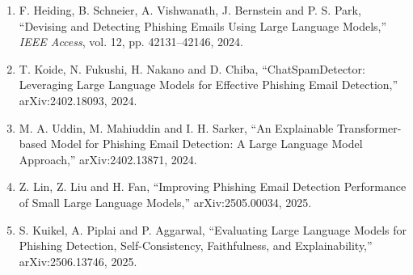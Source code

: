 \documentclass[11pt,a4paper]{article}
\begin{document}
\begin{enumerate}
\item F. Heiding, B. Schneier, A. Vishwanath, J. Bernstein and P. S. Park, ``Devising and Detecting Phishing Emails Using Large Language Models,'' \textit{IEEE Access}, vol. 12, pp. 42131--42146, 2024.
\item T. Koide, N. Fukushi, H. Nakano and D. Chiba, ``ChatSpamDetector: Leveraging Large Language Models for Effective Phishing Email Detection,'' arXiv:2402.18093, 2024.
\item M. A. Uddin, M. Mahiuddin and I. H. Sarker, ``An Explainable Transformer-based Model for Phishing Email Detection: A Large Language Model Approach,'' arXiv:2402.13871, 2024.
\item Z. Lin, Z. Liu and H. Fan, ``Improving Phishing Email Detection Performance of Small Large Language Models,'' arXiv:2505.00034, 2025.
\item S. Kuikel, A. Piplai and P. Aggarwal, ``Evaluating Large Language Models for Phishing Detection, Self-Consistency, Faithfulness, and Explainability,'' arXiv:2506.13746, 2025.
\end{enumerate}
\end{document}
